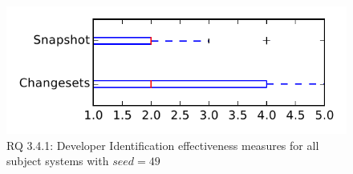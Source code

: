 
\begin{figure}
\centering
\includegraphics[height=0.4\textheight]{figures/dit_seed/rq1_tiny_49}
\caption{RQ 3.4.1: Developer Identification effectiveness measures for all subject systems with $seed=49$}
\label{fig:dit_seed:rq1:tiny}
\end{figure}
